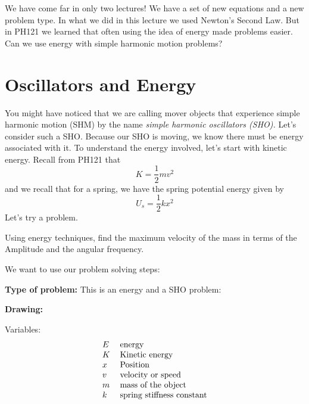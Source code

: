 \documentclass{book}
\begin{document}
We have come far in only two lectures! We have a set of new equations and a
new problem type. In what we did in this lecture we used Newton's Second
Law. But in PH121 we learned that often using the idea of energy made
problems easier. Can we use energy with simple harmonic motion problems?

\section{Oscillators and Energy}

You might have noticed that we are calling mover objects that experience
simple harmonic motion (SHM) by the name \emph{simple harmonic oscillators
(SHO). }Let's consider such a SHO. Because our SHO is moving, we know there
must be energy associated with it. To understand the energy involved, let's
start with kinetic energy. Recall from PH121 that 
\begin{equation}
K=\frac{1}{2}mv^{2}
\end{equation}%
and we recall that for a spring, we have the spring potential energy given by%
\begin{equation}
U_{s}=\frac{1}{2}kx^{2}
\end{equation}%
Let's try a problem.

Using energy techniques, find the maximum velocity of the mass in terms of
the Amplitude and the angular frequency.

We want to use our problem solving steps:

\textbf{Type of problem:} This is an energy and a SHO problem:

\textbf{Drawing:} 

Variables: 
\begin{equation*}
\begin{tabular}{ll}
$E$ & energy \\ 
$K$ & Kinetic energy \\ 
$x$ & Position \\ 
$v$ & velocity or speed \\ 
$m$ & mass of the object \\ 
$k$ & spring stiffness constant%
\end{tabular}%
\end{equation*}
\end{document}
